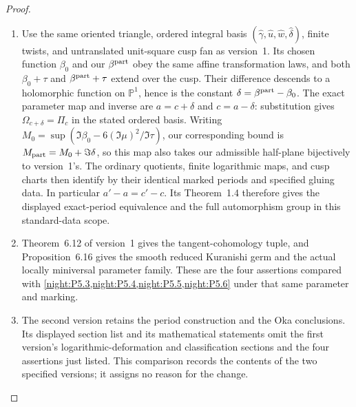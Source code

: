 \begin{proof}
\begin{enumerate}[label=\arabic*.]
\item Use the same oriented triangle, ordered integral basis
$(\widehat\gamma,\widehat u,\widehat w,\widehat\delta)$,
finite twists, and untranslated unit-square cusp fan as version~1.
Its chosen function $\beta_0$ and our $\beta^{\rm part}$ obey the
same affine transformation laws, and both $\beta_0+\tau$ and
$\beta^{\rm part}+\tau$ extend over the cusp. Their difference
descends to a holomorphic function on $\mathbb P^1$, hence is the
constant $\delta=\beta^{\rm part}-\beta_0$. The exact parameter
map and inverse are $a=c+\delta$ and $c=a-\delta$: substitution
gives $\Omega_{c+\delta}=\Pi_c$ in the stated ordered basis.
Writing $M_0=\sup(\Im\beta_0-6(\Im\mu)^2/\Im\tau)$,
our corresponding bound is $M_{\rm part}=M_0+\Im\delta$, so this
map also takes our admissible half-plane bijectively to version~1's.
The ordinary quotients, finite logarithmic maps, and cusp charts
then identify by their identical marked periods and specified
gluing data. In particular $a'-a=c'-c$. Its Theorem~1.4 therefore
gives the displayed exact-period equivalence and the full
automorphism group in this standard-data scope.
\item Theorem~6.12 of version~1 gives the tangent-cohomology tuple,
and Proposition~6.16 gives the smooth reduced Kuranishi germ and
the actual locally miniversal parameter family. These are the
four assertions compared with \cref{night:P5.3,night:P5.4,night:P5.5,night:P5.6}
under that same parameter and marking.
\item The second version retains the period construction and the
Oka conclusions. Its displayed section list and its mathematical
statements omit the first version's logarithmic-deformation and
classification sections and the four assertions just listed.
This comparison records the contents of the two specified versions;
it assigns no reason for the change.
\end{enumerate}
\end{proof}
